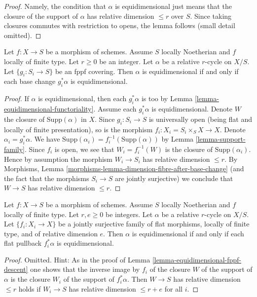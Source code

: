 \begin{proof}
Namely, the condition that $\alpha$ is equidimensional just means that
the closure of the support of $\alpha$ has relative dimension $\leq r$
over $S$. Since taking closures commutes with restriction to opens,
the lemma follows (small detail omitted).
\end{proof}

\begin{lemma}
\label{lemma-equidimensional-fppf-descent}
Let $f : X \to S$ be a morphism of schemes. Assume $S$ locally Noetherian
and $f$ locally of finite type. Let $r \geq 0$ be an integer. Let $\alpha$
be a relative $r$-cycle on $X/S$. Let $\{g_i : S_i \to S\}$
be an fppf covering. Then $\alpha$ is equidimensional
if and only if each base change $g_i^*\alpha$ is equidimensional.
\end{lemma}

\begin{proof}
If $\alpha$ is equidimensional, then each $g_i^*\alpha$ is too by
Lemma \ref{lemma-equidimensional-functoriality}. Assume each $g_i^*\alpha$
is equidimensional. Denote $W$ the closure
of $\text{Supp}(\alpha)$ in $X$. Since $g_i : S_i \to S$ is universally open
(being flat and locally of finite presentation), so is the morphism
$f_i : X_i = S_i \times_S X \to X$. Denote $\alpha_i = g_i^*\alpha$. We have
$\text{Supp}(\alpha_i) = f_i^{-1}(\text{Supp}(\alpha))$ by
Lemma \ref{lemma-support-family}.
Since $f_i$ is open, we see that $W_i = f_i^{-1}(W)$ is the closure
of $\text{Supp}(\alpha_i)$. Hence by assumption the morphism
$W_i \to S_i$ has relative dimension $\leq r$.
By Morphisms, Lemma \ref{morphisms-lemma-dimension-fibre-after-base-change}
(and the fact that the morphisms $S_i \to S$ are jointly surjective)
we conclude that $W \to S$ has relative dimension $\leq r$.
\end{proof}

\begin{lemma}
\label{lemma-equidimensional-descent-pullbacks}
Let $f : X \to S$ be a morphism of schemes. Assume $S$ locally Noetherian
and $f$ locally of finite type. Let $r, e \geq 0$ be integers.
Let $\alpha$ be a relative $r$-cycle on $X/S$.
Let $\{f_i : X_i \to X\}$ be a jointly surjective family
of flat morphisms, locally of finite type, and of relative dimension $e$.
Then $\alpha$ is equidimensional if and only if each flat
pullback $f_i^*\alpha$ is equidimensional.
\end{lemma}

\begin{proof}
Omitted. Hint: As in the proof of Lemma \ref{lemma-equidimensional-fppf-descent}
one shows that the inverse image by $f_i$ of the closure $W$ of the support of
$\alpha$ is the closure $W_i$ of the support of $f_i^*\alpha$. Then
$W \to S$ has relative dimension $\leq r$ holds if $W_i \to S$
has relative dimension $\leq r + e$ for all $i$.
\end{proof}


